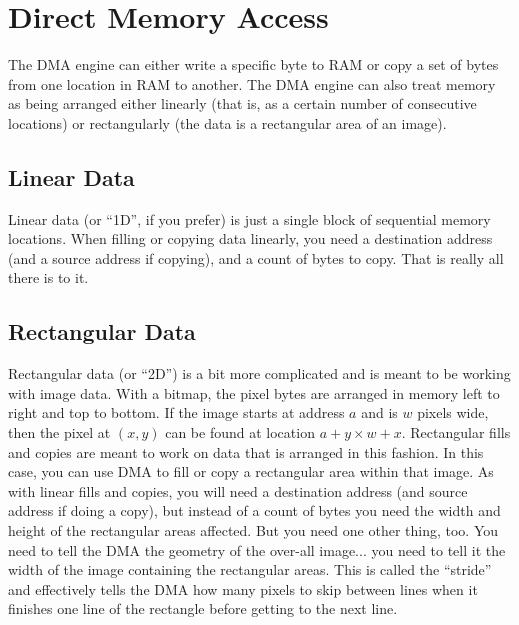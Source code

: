 \chapter{Direct Memory Access}

The DMA engine can either write a specific byte to RAM or copy a set of bytes from one location in RAM to another. The DMA engine can also treat memory as being arranged either linearly (that is, as a certain number of consecutive locations) or rectangularly (the data is a rectangular area of an image).

\section{Linear Data}
Linear data (or ``1D'', if you prefer) is just a single block of sequential memory locations. When filling or copying data linearly, you need a destination address (and a source address if copying), and a count of bytes to copy. That is really all there is to it.

\section{Rectangular Data}
Rectangular data (or ``2D'') is a bit more complicated and is meant to be working with image data. With a bitmap, the pixel bytes are arranged in memory left to right and top to bottom. If the image starts at address $a$ and is $w$ pixels wide, then the pixel at $(x, y)$ can be found at location $a + y \times w + x$. Rectangular fills and copies are meant to work on data that is arranged in this fashion. In this case, you can use DMA to fill or copy a rectangular area within that image. As with linear fills and copies, you will need a destination address (and source address if doing a copy), but instead of a count of bytes you need the width and height of the rectangular areas affected. But you need one other thing, too. You need to tell the DMA the geometry of the over-all image... you need to tell it the width of the image containing the rectangular areas. This is called the ``stride'' and effectively tells the DMA how many pixels to skip between lines when it finishes one line of the rectangle before getting to the next line.

